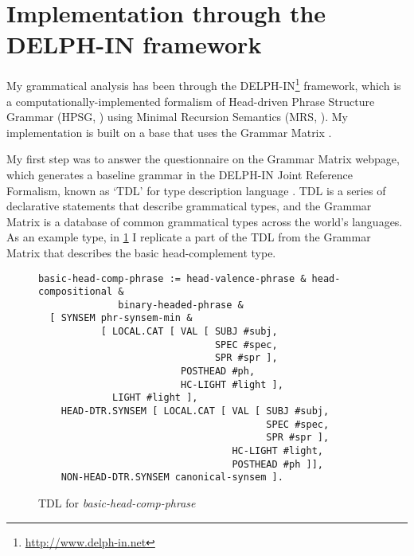 \section{Implementation through the DELPH-IN framework} \label{ch:method:delphin}

My grammatical analysis has been through the DELPH-IN\footnote{\url{http://www.delph-in.net}} framework, which is a computationally-implemented formalism of Head-driven Phrase Structure Grammar (HPSG, \citealt{pollardsag1994}) using Minimal Recursion Semantics (MRS, \citealt{copestake2005}). My implementation is built on a base that uses the Grammar Matrix \citep{bender2002, flickinger2003, benderetal2010}.

My first step was to answer the questionnaire on the Grammar Matrix webpage, which generates a baseline grammar in the DELPH-IN Joint Reference Formalism, known as `TDL' for type description language \citep{copestake2002b}. TDL is a series of declarative statements that describe grammatical types, and the Grammar Matrix is a database of common grammatical types across the world's languages. As an example type, in \cref{figure:basic-head-comp-phrase} I replicate a part of the TDL from the Grammar Matrix that describes the basic head-complement type.


\begin{figure}[H]
\caption{TDL for \textit{basic-head-comp-phrase}}
\label{figure:basic-head-comp-phrase}
\begin{singlespacing}
\begin{verbatim}
basic-head-comp-phrase := head-valence-phrase & head-compositional &
              binary-headed-phrase &
  [ SYNSEM phr-synsem-min &
           [ LOCAL.CAT [ VAL [ SUBJ #subj,
                               SPEC #spec,
                               SPR #spr ],
                         POSTHEAD #ph,
                         HC-LIGHT #light ],
             LIGHT #light ],
    HEAD-DTR.SYNSEM [ LOCAL.CAT [ VAL [ SUBJ #subj,
                                        SPEC #spec,
                                        SPR #spr ],
                                  HC-LIGHT #light,
                                  POSTHEAD #ph ]],
    NON-HEAD-DTR.SYNSEM canonical-synsem ].
\end{verbatim}
\end{singlespacing}
\end{figure}

\vspace{-5pt}

